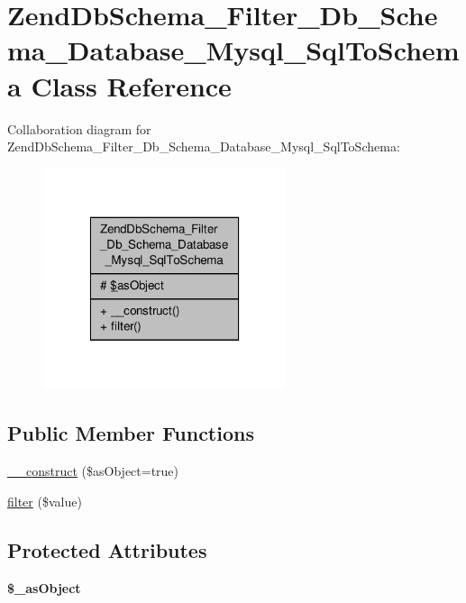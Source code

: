 \hypertarget{classZendDbSchema__Filter__Db__Schema__Database__Mysql__SqlToSchema}{\section{Zend\-Db\-Schema\-\_\-\-Filter\-\_\-\-Db\-\_\-\-Schema\-\_\-\-Database\-\_\-\-Mysql\-\_\-\-Sql\-To\-Schema Class Reference}
\label{classZendDbSchema__Filter__Db__Schema__Database__Mysql__SqlToSchema}
}


Collaboration diagram for Zend\-Db\-Schema\-\_\-\-Filter\-\_\-\-Db\-\_\-\-Schema\-\_\-\-Database\-\_\-\-Mysql\-\_\-\-Sql\-To\-Schema\-:\nopagebreak
\begin{figure}[H]
\begin{center}
\leavevmode
\includegraphics[width=202pt]{classZendDbSchema__Filter__Db__Schema__Database__Mysql__SqlToSchema__coll__graph}
\end{center}
\end{figure}
\subsection*{Public Member Functions}
\begin{DoxyCompactItemize}
\item 
\hyperlink{classZendDbSchema__Filter__Db__Schema__Database__Mysql__SqlToSchema_a59acdfdaf2bea985f9427e61876069bb}{\-\_\-\-\_\-construct} (\$as\-Object=true)
\item 
\hyperlink{classZendDbSchema__Filter__Db__Schema__Database__Mysql__SqlToSchema_a1fa11c8a5dcb3b630e67550667378c04}{filter} (\$value)
\end{DoxyCompactItemize}
\subsection*{Protected Attributes}
\begin{DoxyCompactItemize}
\item 
\hypertarget{classZendDbSchema__Filter__Db__Schema__Database__Mysql__SqlToSchema_a88bab35946a3b3f34124b45295eeafea}{{\bfseries \$\-\_\-as\-Object}}\label{classZendDbSchema__Filter__Db__Schema__Database__Mysql__SqlToSchema_a88bab35946a3b3f34124b45295eeafea}

\end{DoxyCompactItemize}



